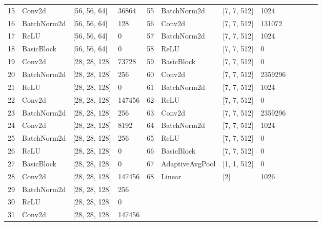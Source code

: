 \begin{table}[!hpt]
\begin{tabular}{@{}llllllllllll@{}}
        15 & Conv2d         & [56, 56, 64]      & 36864   &  55 & BatchNorm2d     & [7, 7, 512]       & 1024        \\
        16 & BatchNorm2d    & [56, 56, 64]      & 128     &  56 & Conv2d          & [7, 7, 512]       & 131072      \\
        17 & ReLU           & [56, 56, 64]      & 0       &  57 & BatchNorm2d     & [7, 7, 512]       & 1024        \\
        18 & BasicBlock     & [56, 56, 64]      & 0       &  58 & ReLU            & [7, 7, 512]       & 0           \\
        19 & Conv2d         & [28, 28, 128]     & 73728   &  59 & BasicBlock      & [7, 7, 512]       & 0           \\    
        20 & BatchNorm2d    & [28, 28, 128]     & 256     &  60 & Conv2d          & [7, 7, 512]       & 2359296     \\    
        21 & ReLU           & [28, 28, 128]     & 0       &  61 & BatchNorm2d     & [7, 7, 512]       & 1024        \\         
        22 & Conv2d         & [28, 28, 128]     & 147456  &  62 & ReLU            & [7, 7, 512]       & 0           \\      
        23 & BatchNorm2d    & [28, 28, 128]     & 256     &  63 & Conv2d          & [7, 7, 512]       & 2359296     \\    
        24 & Conv2d         & [28, 28, 128]     & 8192    &  64 & BatchNorm2d     & [7, 7, 512]       & 1024        \\
        25 & BatchNorm2d    & [28, 28, 128]     & 256     &  65 & ReLU            & [7, 7, 512]       & 0           \\
        26 & ReLU           & [28, 28, 128]     & 0       &  66 & BasicBlock      & [7, 7, 512]       & 0           \\
        27 & BasicBlock     & [28, 28, 128]     & 0       &  67 & AdaptiveAvgPool & [1, 1, 512]       & 0           \\
        28 & Conv2d         & [28, 28, 128]     & 147456  &  68 & Linear          & [2]               & 1026        \\
        29 & BatchNorm2d    & [28, 28, 128]     & 256     &     &                 &                   &             \\
        30 & ReLU           & [28, 28, 128]     & 0       &     &                 &                   &             \\  
        31 & Conv2d         & [28, 28, 128]     & 147456  &     &                 &                   &             \\  

\end{tabular}
\end{table}

